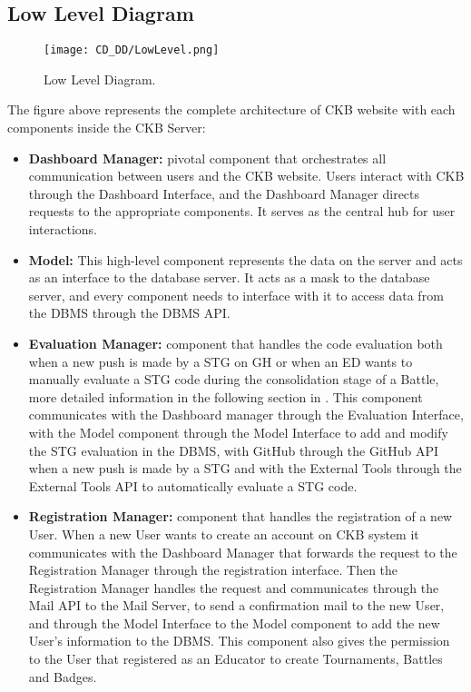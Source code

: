 \subsection{Low Level Diagram}
\label{subsec:low_level_diagram}%

\begin{figure}[H]
    \begin{center}
        \texttt{[image: CD\_DD/LowLevel.png]}
        \caption{Low Level Diagram.}
        \label{fig:low_level_diagram}%
    \end{center}
\end{figure}

\noindent The figure above represents the complete architecture of CKB website with each components inside the CKB Server:
\begin{itemize}
    \item \textbf{Dashboard Manager:} pivotal component that orchestrates all communication between users and the CKB website. Users interact with CKB through the Dashboard Interface, and the Dashboard Manager directs requests to the appropriate components. It serves as the central hub for user interactions.
    \item \textbf{Model:} This high-level component represents the data on the server and acts as an interface to the database server. It acts as a mask to the database server, and every component needs to interface with it to access data from the DBMS through the DBMS API.
    \item \textbf{Evaluation Manager:} component that handles the code evaluation both when a new push is made by a STG on GH or when an ED wants to manually evaluate a STG code during the consolidation stage of a Battle, more detailed information in the following section in . This component communicates with the Dashboard manager through the Evaluation Interface, with the Model component through the Model Interface to add and modify the STG evaluation in the DBMS, with GitHub through the GitHub API when a new push is made by a STG and with the External Tools through the External Tools API to automatically evaluate a STG code.
    \item \textbf{Registration Manager:} component that handles the registration of a new User. When a new User wants to create an account on CKB system it communicates with the Dashboard Manager that forwards the request to the Registration Manager through the registration interface. Then the Registration Manager handles the request and communicates through the Mail API to the Mail Server, to send a confirmation mail to the new User, and through the Model Interface to the Model component to add the new User’s information to the DBMS. This component also gives the permission to the User that registered as an Educator to create Tournaments, Battles and Badges.

\end{itemize}
